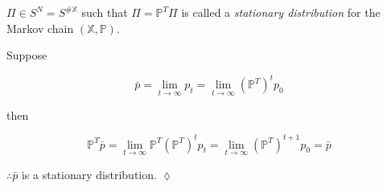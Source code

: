 \begin{definition}
$\Pi\in S^N = S^{\#\mathbb{X}}$ such that $\Pi=\mathbb{P}^T\Pi$ is called a \textit{stationary distribution} for the Markov chain $(\mathbb{X},\mathbb{P})$.
\end{definition}

\begin{example}
Suppose

\begin{equation*}
\bar{p}=\lim_{t\to\infty}p_t = \lim_{t\to\infty}{(\mathbb{P}^T)}^t p_0
\end{equation*}

then

\begin{equation*}
\mathbb{P}^T\bar{p}=\lim_{t\to\infty}\mathbb{P}^T{(\mathbb{P}^T)}^t p_t = \lim_{t\to\infty}{(\mathbb{P}^T)}^{t+1}p_0=\bar{p}
\end{equation*}

$\therefore \bar{p}$ is a stationary distribution.
$\lozenge$
\end{example}
